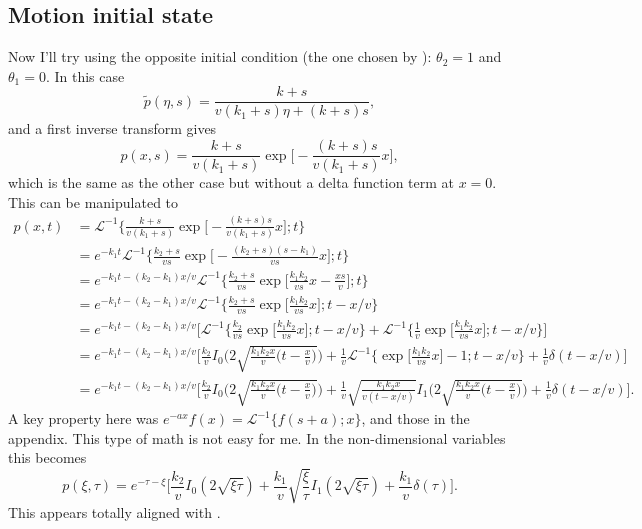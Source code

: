 \documentclass[11pt]{article}
\newcommand\be{\begin{equation}} %
\newcommand\ee{\end{equation}}   %
\newcommand\El{\mathcal{L}}
\begin{document}
\subsection{Motion initial state}

Now I'll try using the opposite initial condition (the one chosen by \citet{Lisle1998}): $\theta_2 = 1$ and $\theta_1 = 0$.
In this case
\be \tilde{p}(\eta,s) = \frac{k+s}{v(k_1+s)\eta + (k+s)s},\ee
and a first inverse transform gives
\be p(x,s) = \frac{k+s}{v(k_1+s)} \exp\Big[-\frac{(k+s)s}{v(k_1+s)}x\Big],\ee
which is the same as the other case but without a delta function term at $x=0$.
This can be manipulated to 
\begin{align} p(x,t) &= \El^{-1} \Big\{ \frac{k+s}{v(k_1+s)} \exp\Big[-\frac{(k+s)s}{v(k_1+s)}x\Big] ; t\Big\} \\
&=  e^{-k_1 t}\El^{-1} \Big\{ \frac{k_2+s}{vs} \exp\Big[-\frac{(k_2+s)(s-k_1)}{vs}x\Big] ; t\Big\} \\
&= e^{-k_1 t -(k_2-k_1)x/v}\El^{-1} \Big\{ \frac{k_2+s}{vs} \exp\Big[\frac{k_1k_2}{vs}x - \frac{xs}{v}\Big] ; t\Big\}\\
&= e^{-k_1 t -(k_2-k_1)x/v}\El^{-1} \Big\{ \frac{k_2+s}{vs} \exp\Big[\frac{k_1k_2}{vs}x\Big] ; t-x/v\Big\} \\
&=  e^{-k_1 t -(k_2-k_1)x/v} \Big[ \El^{-1}  \Big\{ \frac{k_2}{vs} \exp\Big[\frac{k_1k_2}{vs}x\Big];t-x/v \Big\} + \El^{-1}  \Big\{ \frac{1}{v} \exp\Big[\frac{k_1k_2}{vs}x\Big];t-x/v \Big\} \Big] \\
&=  e^{-k_1 t -(k_2-k_1)x/v} \Big[\frac{k_2}{v} I_0\Big(2\sqrt{\frac{k_1k_2 x}{v}\big(t-\frac{x}{v}\big)}\Big) + \frac{1}{v}\El^{-1}\Big\{  \exp\Big[\frac{k_1k_2}{vs}x\Big] -1;t-x/v \Big\} + \frac{1}{v}\delta(t-x/v) \Big] \\ 
&=  e^{-k_1 t -(k_2-k_1)x/v} \Big[\frac{k_2}{v} I_0\Big(2\sqrt{\frac{k_1k_2 x}{v}\big(t-\frac{x}{v}\big)}\Big) + \frac{1}{v}\sqrt{\frac{k_1 k_2 x}{v (t-x/v)}}I_1\Big(2\sqrt{\frac{k_1k_2 x}{v}\big(t-\frac{x}{v}\big)}\Big) + \frac{1}{v}\delta(t-x/v) \Big].
\end{align}
A key property here was $e^{-ax}f(x) = \El^{-1}\{f(s+a);x\}$, and those in the appendix.
This type of math is not easy for me.
In the non-dimensional variables this becomes
\be p(\xi,\tau) = e^{-\tau-\xi}\Big[ \frac{k_2}{v} I_0(2\sqrt{\xi\tau}) + \frac{k_1}{v}\sqrt{\frac{\xi}{\tau}}I_1(2\sqrt{\xi\tau}) + \frac{k_1}{v} \delta(\tau)\Big].\ee
This appears totally aligned with \citet{Lisle1998}.
\end{document}
